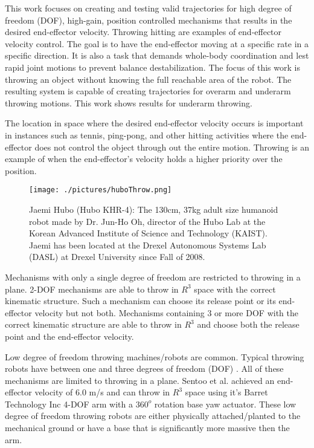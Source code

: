 This work focuses on creating and testing valid trajectories for high degree of freedom (DOF), high-gain, position controlled mechanisms that results in the desired end-effector velocity.  Throwing hitting are examples of end-effector velocity control.  The goal is to have the end-effector moving at a specific rate in a specific direction.  It is also a task that demands whole-body coordination and lest rapid joint motions to prevent balance destabilization.  The focus of this work is throwing an object without knowing the full reachable area of the robot.  The resulting system is capable of creating trajectories for overarm and underarm throwing motions.  This work shows results for underarm throwing.

The location in space where the desired end-effector velocity occurs is important in instances such as tennis, ping-pong, and other hitting activities where the end-effector does not control the object through out the entire motion.  Throwing is an example of when the end-effector's velocity holds a higher priority over the position.  

\begin{figure}[thpb]
  \centering
\texttt{[image: ./pictures/huboThrow.png]}
  \caption{Jaemi Hubo (Hubo KHR-4): The 130cm, 37kg adult size humanoid robot made by Dr. Jun-Ho Oh, director of the Hubo Lab at the Korean Advanced Institute of Science and Technology (KAIST).  Jaemi has been located at the Drexel Autonomous Systems Lab (DASL) at Drexel University since Fall of 2008.}
  \label{fig:huboOneFoot}
\end{figure}

Mechanisms with only a single degree of freedom are restricted to throwing in a plane.   2-DOF mechanisms are able to throw in $R^3$ space with the correct kinematic structure.  Such a mechanism can choose its release point or its end-effector velocity but not both.  Mechanisms containing 3 or more DOF with the correct kinematic structure are able to throw in $R^3$ and choose both the release point and the end-effector velocity.  

Low degree of freedom throwing machines/robots are common.  Typical throwing robots have between one and three degrees of freedom (DOF) \cite{509405, Lynch97dynamicnonprehensile, 5152525, 509335, springerlink:10.1007/s10015-006-0401-0}.  All of these mechanisms are limited to throwing in a plane.   Sentoo et al.\cite{4651142} achieved an end-effector velocity of 6.0 m/s and can throw in $R^3$ space using it's Barret Technology Inc 4-DOF arm with a $360^o$ rotation base yaw actuator.  These low degree of freedom throwing robots are either physically attached/planted to the mechanical ground or have a base that is significantly more massive then the arm.  

